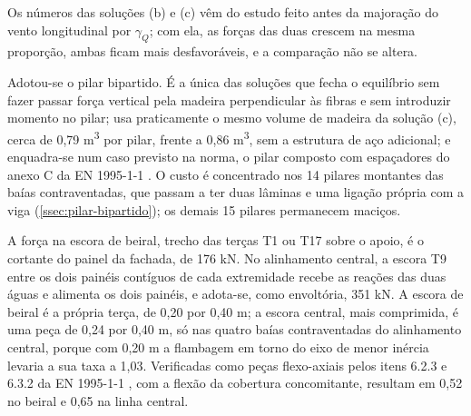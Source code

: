 
Os números das soluções (b) e (c) vêm do estudo feito antes da majoração do vento
longitudinal por $\gamma_Q$; com ela, as forças das duas crescem na mesma proporção,
ambas ficam mais desfavoráveis, e a comparação não se altera.

Adotou-se o pilar bipartido. É a única das soluções que fecha o equilíbrio sem
fazer passar força vertical pela madeira perpendicular às fibras e sem introduzir
momento no pilar; usa praticamente o mesmo volume de madeira da solução (c), cerca
de 0,79 m\textsuperscript{3} por pilar, frente a 0,86 m\textsuperscript{3}, sem a
estrutura de aço adicional; e enquadra-se num caso previsto na norma, o pilar
composto com espaçadores do anexo C da EN 1995-1-1 \cite{EN1995-1-1:2004}. O
custo é concentrado nos 14 pilares montantes das baías contraventadas, que passam
a ter duas lâminas e uma ligação própria com a viga
(\autoref{ssec:pilar-bipartido}); os demais 15 pilares permanecem maciços.

A força na escora de beiral, trecho das terças T1 ou T17 sobre o apoio, é o
cortante do painel da fachada, de 176 kN. No
alinhamento central, a escora T9 entre os dois painéis contíguos de cada
extremidade recebe as reações das duas águas e alimenta os dois painéis, e
adota-se, como envoltória, 351 kN. A escora de beiral é a própria terça, de 0,20
por 0,40 m; a escora central, mais comprimida, é uma peça de 0,24 por 0,40 m, só
nas quatro baías contraventadas do alinhamento central, porque com 0,20 m a
flambagem em torno do eixo de menor inércia levaria a sua taxa a 1,03. Verificadas
como peças flexo-axiais pelos itens 6.2.3 e 6.3.2 da
EN 1995-1-1 \cite{EN1995-1-1:2004}, com a flexão da cobertura concomitante,
resultam em 0,52 no beiral e 0,65 na linha central.

